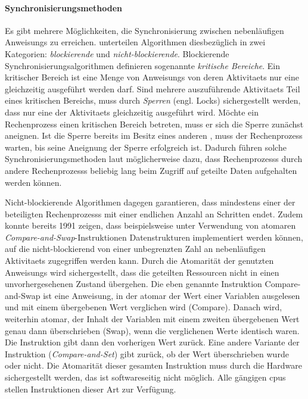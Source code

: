 \paragraph{Synchronisierungsmethoden} Es gibt mehrere Möglichkeiten, die Synchronisierung zwischen nebenläufigen \glspl{Anweisung} zu erreichen. \textcite{Michael1996} unterteilen Algorithmen diesbezüglich in zwei Kategorien: \emph{blockierende} und \emph{nicht-blockierende}. Blockierende Synchronisierungsalgorithmen definieren sogenannte \emph{kritische Bereiche}. Ein kritischer Bereich ist eine Menge von \glspl{Anweisung} von deren \glspl{Aktivitaet} nur eine gleichzeitig ausgeführt werden darf. Sind mehrere auszuführende \glspl{Aktivitaet} Teil eines kritischen Bereichs, muss durch \emph{Sperren} (engl. Locks) sichergestellt werden, dass nur eine der \glspl{Aktivitaet} gleichzeitig ausgeführt wird. Möchte ein \gls{Rechenprozess} einen kritischen Bereich betreten, muss er sich die Sperre zunächst aneignen. Ist die Sperre bereits im Besitz eines anderen , muss der \gls{Rechenprozess} warten, bis seine Aneignung der Sperre erfolgreich ist. Dadurch führen solche Synchronisierungsmethoden laut \textcite{Michael1996} möglicherweise dazu, dass \glspl{Rechenprozess} durch andere \glspl{Rechenprozess} beliebig lang beim Zugriff auf geteilte Daten aufgehalten werden können.

Nicht-blockierende Algorithmen dagegen garantieren, dass mindestens einer der beteiligten \glspl{Rechenprozess} mit einer endlichen Anzahl an Schritten endet. Zudem konnte \textcite{Herlihy1991} bereits 1991 zeigen, dass beispielsweise unter Verwendung von atomaren \emph{Compare-and-Swap}-Instruktionen Datenstrukturen implementiert werden können, auf die nicht-blockierend von einer unbegrenzten Zahl an nebenläufigen \glspl{Aktivitaet} zugegriffen werden kann. Durch die Atomarität der genutzten \glspl{Anweisung} wird sichergestellt, dass die geteilten Ressourcen nicht in einen unvorhergesehenen Zustand übergehen. Die eben genannte Instruktion Compare-and-Swap ist eine \gls{Anweisung}, in der atomar der Wert einer Variablen ausgelesen und mit einem übergebenen Wert verglichen wird (Compare). Danach wird, weiterhin atomar, der Inhalt der Variablen mit einem zweiten übergebenen Wert genau dann überschrieben (Swap), wenn die verglichenen Werte identisch waren. Die Instruktion gibt dann den vorherigen Wert zurück. Eine andere Variante der Instruktion (\emph{Compare-and-Set}) gibt zurück, ob der Wert überschrieben wurde oder nicht. Die Atomarität dieser gesamten Instruktion muss durch die Hardware sichergestellt werden, das ist softwareseitig nicht möglich. Alle gängigen \acp{cpu} stellen Instruktionen dieser Art zur Verfügung.
